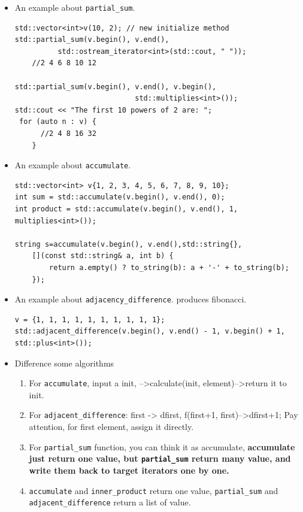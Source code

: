 \documentclass[a4paper,11pt,twoside]{book}
\begin{document}
\begin{itemize}

\item An example about \texttt{partial\_sum}.

\begin{lstlisting}[numbers=none]
std::vector<int>v(10, 2); // new initialize method
std::partial_sum(v.begin(), v.end(),
          std::ostream_iterator<int>(std::cout, " "));
    //2 4 6 8 10 12

std::partial_sum(v.begin(), v.end(), v.begin(),
                            std::multiplies<int>());
std::cout << "The first 10 powers of 2 are: ";
 for (auto n : v) {
      //2 4 8 16 32
    }
\end{lstlisting}
\item An example about \texttt{accumulate}.

\begin{lstlisting}[numbers=none]
std::vector<int> v{1, 2, 3, 4, 5, 6, 7, 8, 9, 10};
int sum = std::accumulate(v.begin(), v.end(), 0);
int product = std::accumulate(v.begin(), v.end(), 1, multiplies<int>());

string s=accumulate(v.begin(), v.end(),std::string{},
    [](const std::string& a, int b) {
    	return a.empty() ? to_string(b): a + '-' + to_string(b); 
    });
\end{lstlisting}

\item An example about \texttt{adjacency\_difference}. produces fibonacci.
\begin{lstlisting}[numbers=none]
v = {1, 1, 1, 1, 1, 1, 1, 1, 1, 1};
std::adjacent_difference(v.begin(), v.end() - 1, v.begin() + 1, std::plus<int>());
\end{lstlisting}

\item Difference some algorithms
\begin{enumerate}
\item For \texttt{accumulate}, input a init, -->calculate(init, element)-->return it to init.
\item For \texttt{adjacent\_difference}:   first -> dfirst,  f(first+1, first)-->dfirst+1; Pay attention, for first element, assign it directly.
\item For \texttt{partial\_sum} function, you can think it as accumulate, \textbf{accumulate just return one value, but \texttt{partial\_sum} return many value, and write them back to target iterators one by one.  }
\item \texttt{accumulate} and \texttt{inner\_product} return one value, \texttt{partial\_sum} and \texttt{adjacent\_difference} return a list of value.
\end{enumerate}

\end{itemize}
\end{document}
